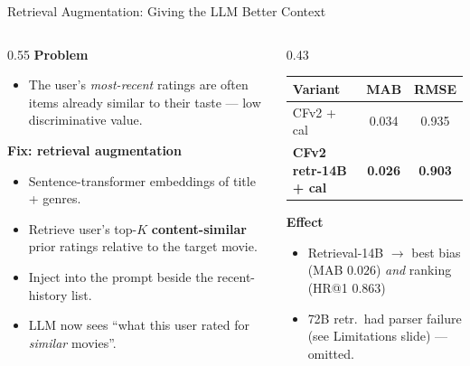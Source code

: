 \documentclass[aspectratio=169,10pt]{beamer}
\newcommand{\good}[1]{\textcolor{goodgreen}{\textbf{#1}}}
\newcommand{\cf}[1]{\textcolor{cfblue}{\textbf{#1}}}
\begin{document}
\begin{frame}{Retrieval Augmentation: Giving the LLM Better Context}
  \begin{columns}[T,onlytextwidth]
    \begin{column}{0.55\textwidth}
      \textbf{Problem}
      \begin{itemize}
        \item The user's \emph{most-recent} ratings are often items already
              similar to their taste — low discriminative value.
      \end{itemize}
      \textbf{Fix: retrieval augmentation}
      \begin{itemize}\itemsep1pt
        \item Sentence-transformer embeddings of title + genres.
        \item Retrieve user's top-$K$ \cf{content-similar} prior ratings
              relative to the target movie.
        \item Inject into the prompt beside the recent-history list.
        \item LLM now sees ``what this user rated for \emph{similar} movies''.
      \end{itemize}
    \end{column}
    \begin{column}{0.43\textwidth}
      \centering
      \scriptsize
      \begin{tabular}{lcc}
        \toprule
        Variant & MAB & RMSE \\ \midrule
        CFv2 + cal              & 0.034 & 0.935 \\
        \good{CFv2 retr-14B + cal} & \good{0.026} & \good{0.903} \\
        \bottomrule
      \end{tabular}
      \vspace{0.6em}
      \textbf{Effect}
      \begin{itemize}\itemsep0pt\scriptsize
        \item Retrieval-14B $\to$ best bias (MAB $0.026$) \emph{and} ranking (HR@1 $0.863$)
        \item 72B retr.\ had parser failure (see Limitations slide) — omitted.
      \end{itemize}
    \end{column}
  \end{columns}
\end{frame}
\end{document}
